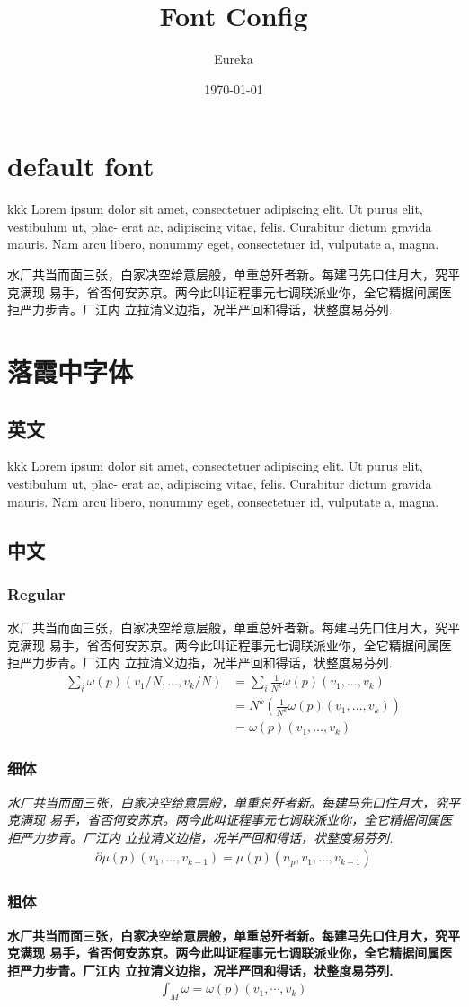 \documentclass[
  class=article,
  lang=cn,
]{zlatex}
\title{Font Config}
\author{Eureka}
\date{\today}
\begin{document}
\orimaketitle
\tableofcontents
\fancyhf{}
\newpage

\def\entest{kkk Lorem ipsum dolor sit amet, consectetuer adipiscing elit. Ut purus elit, vestibulum ut, plac-
erat ac, adipiscing vitae, felis. Curabitur dictum gravida mauris. Nam arcu libero, nonummy
eget, consectetuer id, vulputate a, magna.}

\def\cjktest{水厂共当而面三张，白家决空给意层般，单重总歼者新。每建马先口住月大，究平克满现
易手，省否何安苏京。两今此叫证程事元七调联派业你，全它精据间属医拒严力步青。厂江内
立拉清义边指，况半严回和得话，状整度易芬列.}

\section{default font}
\entest

\cjktest

\section{落霞中字体}
\subsection{英文}
{\lxgen \entest}

\subsection{中文}
\subsubsection{Regular}
{ \cjktest}
\begin{align}
  \sum_{i}\omega(p)(v_{1}/N,\ldots,v_{k}/N)& =\sum_i\frac1{N^k}\omega(p)(v_1,\ldots,v_k)  \\
    &=N^{k}\left(\frac{1}{N^{k}}\omega(p)(v_{1},\ldots,v_{k})\right) \\
    &=\omega(p)(v_{1},\ldots,v_{k})
\end{align}

\subsubsection{细体}
{\itshape \cjktest}
\begin{align}
  \partial\mu(p)(v_1,\ldots,v_{k-1})=\mu(p)(n_p,v_1,\ldots,v_{k-1})
\end{align}

\subsubsection{粗体}
{\bfseries \cjktest}
\begin{align}
  \int_{M }^{}{\omega} = \omega(p)(v_1, \cdots, v_k)
\end{align}
\end{document}
